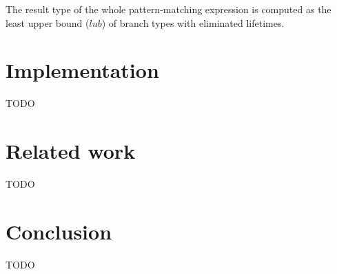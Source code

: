\documentclass[11pt]{article}
\begin{document}
    The result type of the whole pattern-matching expression is computed as the least upper bound ($lub$) of branch types with eliminated lifetimes.


    \section{Implementation}

    TODO %


    \section{Related work}

    TODO %


    \section{Conclusion}

    TODO %

    
    
\end{document}
